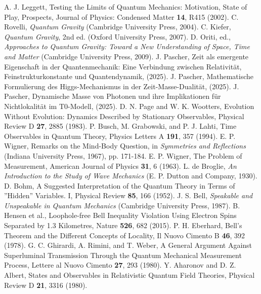 \documentclass[12pt,a4paper]{article}
\begin{document}
\begin{thebibliography}{99}
		 A. J. Leggett, Testing the Limits of Quantum Mechanics: Motivation, State of Play, Prospects, Journal of Physics: Condensed Matter \textbf{14}, R415 (2002).
		 C. Rovelli, \textit{Quantum Gravity} (Cambridge University Press, 2004).
		 C. Kiefer, \textit{Quantum Gravity}, 2nd ed. (Oxford University Press, 2007).
		 D. Oriti, ed., \textit{Approaches to Quantum Gravity: Toward a New Understanding of Space, Time and Matter} (Cambridge University Press, 2009).
		 J. Pascher, Zeit als emergente Eigenschaft in der Quantenmechanik: Eine Verbindung zwischen Relativität, Feinstrukturkonstante und Quantendynamik, (2025).
		 J. Pascher, Mathematische Formulierung des Higgs-Mechanismus in der Zeit-Masse-Dualität, (2025).
		 J. Pascher, Dynamische Masse von Photonen und ihre Implikationen für Nichtlokalität im T0-Modell, (2025).
		 D. N. Page and W. K. Wootters, Evolution Without Evolution: Dynamics Described by Stationary Observables, Physical Review D \textbf{27}, 2885 (1983).
		 P. Busch, M. Grabowski, and P. J. Lahti, Time Observables in Quantum Theory, Physics Letters A \textbf{191}, 357 (1994).
		 E. P. Wigner, Remarks on the Mind-Body Question, in \textit{Symmetries and Reflections} (Indiana University Press, 1967), pp. 171-184.
		 E. P. Wigner, The Problem of Measurement, American Journal of Physics \textbf{31}, 6 (1963).
		 L. de Broglie, \textit{An Introduction to the Study of Wave Mechanics} (E. P. Dutton and Company, 1930).
		 D. Bohm, A Suggested Interpretation of the Quantum Theory in Terms of ''Hidden'' Variables. I, Physical Review \textbf{85}, 166 (1952).
		 J. S. Bell, \textit{Speakable and Unspeakable in Quantum Mechanics} (Cambridge University Press, 1987).
		 B. Hensen et al., Loophole-free Bell Inequality Violation Using Electron Spins Separated by 1.3 Kilometres, Nature \textbf{526}, 682 (2015).
		 P. H. Eberhard, Bell's Theorem and the Different Concepts of Locality, Il Nuovo Cimento B \textbf{46}, 392 (1978).
		 G. C. Ghirardi, A. Rimini, and T. Weber, A General Argument Against Superluminal Transmission Through the Quantum Mechanical Measurement Process, Lettere al Nuovo Cimento \textbf{27}, 293 (1980).
		 Y. Aharonov and D. Z. Albert, States and Observables in Relativistic Quantum Field Theories, Physical Review D \textbf{21}, 3316 (1980).

\end{thebibliography}
\end{document}
